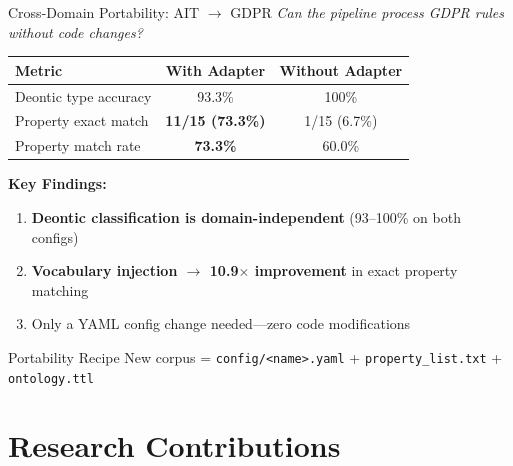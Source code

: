 \documentclass[aspectratio=169, 10pt]{beamer}
\begin{document}
\begin{frame}{Cross-Domain Portability: AIT $\rightarrow$ GDPR}
    \textit{Can the pipeline process GDPR rules without code changes?}
    
    \vspace{0.3cm}
    \begin{table}[]
        \centering
        \begin{tabular}{lcc}
            \toprule
            \textbf{Metric} & \textbf{With Adapter} & \textbf{Without Adapter} \\
            \midrule
            Deontic type accuracy & 93.3\% & 100\% \\
            Property exact match & \textbf{11/15 (73.3\%)} & 1/15 (6.7\%) \\
            Property match rate & \textbf{73.3\%} & 60.0\% \\
            \bottomrule
        \end{tabular}
    \end{table}
    
    \vspace{0.3cm}
    \textbf{Key Findings:}
    \begin{enumerate}
        \item \textbf{Deontic classification is domain-independent} (93--100\% on both configs)
        \item \textbf{Vocabulary injection $\rightarrow$ 10.9$\times$ improvement} in exact property matching
        \item Only a YAML config change needed---zero code modifications
    \end{enumerate}
    
    \vspace{0.2cm}
    \begin{exampleblock}{Portability Recipe}
        New corpus = \texttt{config/<name>.yaml} + \texttt{property\_list.txt} + \texttt{ontology.ttl}
    \end{exampleblock}
\end{frame}

\section{Research Contributions}
\end{document}
